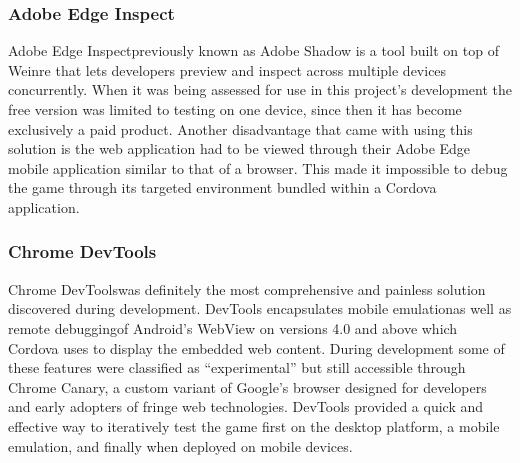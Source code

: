 \documentclass[final]{cmpreport}
\begin{document}

\subsubsection{Adobe Edge Inspect}
Adobe Edge Inspect\footnotemark previously known as Adobe Shadow is a tool built on top of Weinre that lets developers preview and inspect across multiple devices concurrently. 
When it was being assessed for use in this project's development the free version was limited to testing on one device, since then it has become exclusively a paid product. Another disadvantage that came with using this solution is the web application had to be viewed through their Adobe Edge mobile application similar to that of a browser. This made it impossible to debug the game through its targeted environment bundled within a Cordova application.


\subsubsection{Chrome DevTools}
Chrome DevTools\footnotemark was definitely the most comprehensive and painless solution discovered during development. DevTools encapsulates mobile emulation\footnotemark as well as remote debugging\footnotemark of Android's WebView on versions 4.0 and above which Cordova uses to display the embedded web content. During development some of these features were classified as ``experimental'' but still accessible through Chrome Canary\footnotemark, a custom variant of Google's browser designed for developers and early adopters of fringe web technologies. DevTools provided a quick and effective way to iteratively test the game first on the desktop platform, a mobile emulation, and finally when deployed on mobile devices.

\end{document}
